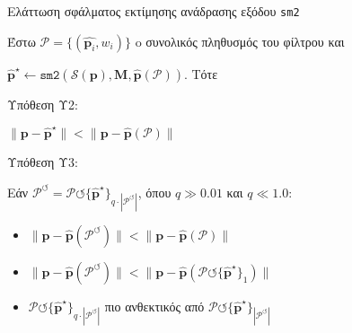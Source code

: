 \begin{frame}[fragile]{Ελάττωση σφάλματος εκτίμησης ανάδρασης εξόδου \texttt{sm2}}

  Έστω $\mathcal{P} = \{(\hat{\bm{p}_i}, w_i)\}$ o συνολικός πληθυσμός του φίλτρου και

  $\hat{\bm{p}}^\star \leftarrow \texttt{sm2}(\mathcal{S}(\bm{p}), \bm{M}, \hat{\bm{p}}(\mathcal{P}))$. Τότε \vspace{0.3cm}

  Υπόθεση Υ2: \vspace{-0.6cm}
  \begin{bw_box}
    $\|\bm{p} - \hat{\bm{p}}^\star\| < \|\bm{p} - \hat{\bm{p}}(\mathcal{P})\|$
  \end{bw_box} \vspace{0.4cm}

  Υπόθεση Υ3: \vspace{-0.6cm}
  \begin{bw_box}

    Εάν $\mathcal{P}^\circlearrowleft = \mathcal{P} \circlearrowleft \{\hat{\bm{p}}^\star\}_{q \cdot |\mathcal{P}^\circlearrowleft|}$,
    όπου $q \gg 0.01$ και $q \ll 1.0$:

    \begin{itemize}
      \item $\|\bm{p} - \hat{\bm{p}}(\mathcal{P}^\circlearrowleft)\|                          < \|\bm{p} - \hat{\bm{p}}(\mathcal{P})\| $
      \item $\|\bm{p} - \hat{\bm{p}}(\mathcal{P}^\circlearrowleft)\| < \|\bm{p} - \hat{\bm{p}}(\mathcal{P} \circlearrowleft \{\hat{\bm{p}}^\star\}_1)\|$
      \item $\mathcal{P} \circlearrowleft \{\hat{\bm{p}}^\star\}_{q \cdot |\mathcal{P}^\circlearrowleft|}$ πιο ανθεκτικός από $\mathcal{P} \circlearrowleft \{\hat{\bm{p}}^\star\}_{|\mathcal{P}^\circlearrowleft|}$
    \end{itemize}

  \end{bw_box}

\end{frame}
